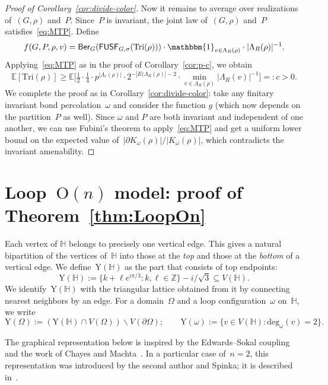 \documentclass[11pt,letterpaper]{amsart}
\newcounter{n}
\numberwithin{n}{section}
\theoremstyle{plain}
\theoremstyle{definition}
\theoremstyle{remark}
\renewcommand\setminus\smallsetminus
\renewcommand\O[1]{\(\mathrm{O}(#1)\)}
\newcommand\Z{\mathbb Z}
\newcommand\hexlattice{{\mathbb H}}
\newcommand\domain\Omega
\newcommand\vertices[1]{{V(#1)}}
\newcommand\upvert{\mathrm{Y}} %
\newcommand{\1}{\mathbbm{1}}
\renewcommand\subset\subseteq
\begin{document}
\begin{proof}[Proof of Corollary~\ref{cor:divide-color}]
	Now it remains to average over realizations of~$(G,\rho)$ and~$P$.
	Since~$P$ is invariant, the joint law of~$(G,\rho)$ and~$P$ satisfies~\eqref{eq:MTP}.
	Define
	\[
		f(G,P,\rho,v) =  \mathsf{Ber}_G(\mathsf{FUSF}_{G,\sigma}(\mathrm{Tri}(\rho)))\cdot \1_{v \in \Lambda_R(\rho)}\cdot |\Lambda_R(\rho)|^{-1}.
	\]
	Applying~\eqref{eq:MTP} as in the proof of Corollary~\ref{cor:p-c}, we obtain
	\[
		\mathbb{E}[\mathrm{Tri}(\rho)] 
		\geq 
		\mathbb{E} \bigg[\tfrac12\cdot \tfrac14\cdot p^{|\Lambda_r(\rho)|} \cdot 2^{-|E(\Lambda_R(\rho)|-2} \cdot \min_{v \in \Lambda_R(\rho)} |\Lambda_R(v)|^{-1} \bigg]  =: c > 0.
	\]
	We complete the proof as in Corollary~\ref{cor:divide-color}: take any finitary invariant bond percolation~$\omega$ and consider the function $g$ (which now depends on the partition~$P$ as well). Since $\omega$ and $P$ are both invariant and independent of one another, we can use Fubini's theorem to apply~\eqref{eq:MTP} and get a uniform lower bound on the expected value of~$|\partial K_{\omega}(\rho)|/|K_{\omega}(\rho)|$, which contradicts the invariant amenability.
\end{proof} 


\section{Loop~\O{n} model: proof of Theorem~\ref{thm:LoopOn}}
\label{section:graph-rep}

Each vertex of $\hexlattice$ belongs to precisely one vertical edge.
This gives a natural bipartition of the vertices of~$\hexlattice$ into those at the \emph{top} and those at the \emph{bottom} of a vertical edge.
We define~$\upvert(\hexlattice)$ as the part that consists of top endpoints:
\[
	\upvert(\hexlattice):=
	\{k+\ell e^{i\pi/3} \colon k,\ell \in \Z\}
	-i/\sqrt3
	\subset
	\vertices{\hexlattice}.
\]
We identify~$\upvert(\hexlattice)$ with the triangular lattice obtained from it by connecting nearest neighbors by an edge.
For a domain~$\domain$ and a loop configuration~$\omega$ on~$\hexlattice$, we write
\[
	\upvert(\domain):=(\upvert(\hexlattice)\cap \vertices\domain)\setminus \vertices{\partial\domain};
	\qquad
	\upvert(\omega):=\{v\in V(\hexlattice) \colon \mathrm{deg}_\omega(v) = 2\}.
\]

The graphical representation below is inspired by the Edwards--Sokal coupling~\cite{EdwSok88} and the work of Chayes and Machta~\cite{ChaMac97}. 
In a particular case of~$n=2$, this representation was introduced by the second author and Spinka; it is described in~\cite{GlaLam25}. 
\end{document}
